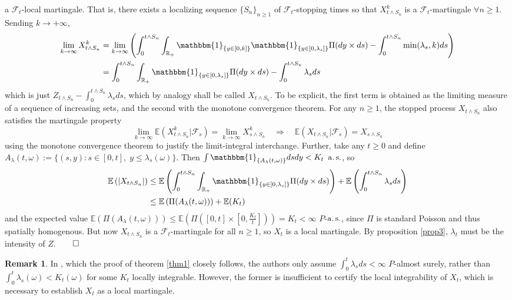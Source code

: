 \documentclass[12pt, oneside]{report}
\newcommand{\E}{\mathbb{E}}
\newcommand{\mbb}[1]{\mathbb{#1}}
\newcommand{\1}[1]{\mathbbm{1}_{\{#1\}}}
\newcommand{\mc}[1]{\mathcal{#1}}
\theoremstyle{definition}
\newtheorem{remark}[theorem]{Remark}
\begin{document}
a $\mc{F}_t$-local martingale. That is, there exists a localizing sequence
$\{S_n\}_{n\geq 1}$ of $\mc{F}_t$-stopping times so that $X^k_{t\wedge S_n}$ is
a $\mc{F}_t$-martingale $\forall n\geq 1$. Sending $k\rightarrow+\infty$,
\begin{align*}
    \lim_{k\rightarrow\infty}X^k_{t\wedge S_n}&=\lim_{k\rightarrow\infty}\left(\int^{t\wedge S_n}_0\int_{\mbb{R}_+}\1{y\in[0,k]}\1{y\in[0,\lambda_s]}\Pi(dy\times ds)-\int_0^{t\wedge S_n}\min(\lambda_s,k)ds\right)\\
    &=\int_0^{t\wedge S_n}\int_{\mbb{R}_+}\1{y\in[0,\lambda_s]}\Pi(dy\times ds)-\int_0^{t\wedge S_n}\lambda_sds
\end{align*}
which is just $Z_{t\wedge S_n}-\int_0^{t\wedge S_n}\lambda_sds$, which by
analogy shall be called $X_{t\wedge S_n}$. To be explicit, the first term is
obtained as the limiting measure of a sequence of increasing sets, and the
second with the monotone convergence theorem. For any $n\geq 1$, the stopped
process $X_{t\wedge S_n}$ also satisfies the martingale property
\[\lim_{k\rightarrow\infty}\E\left(X^k_{t\wedge
S_n}|\mc{F}_s\right)=\lim_{k\rightarrow\infty}X^k_{s\wedge
S_n}\quad\Rightarrow\quad\E\left(X_{t\wedge S_n}|\mc{F}_s\right)=X_{s\wedge
S_n}\] using the monotone convergence theorem to justify the limit-integral
interchange. Further, take any $t\geq 0$ and define
$A_\lambda(t,\omega):=\{(s,y):s\in[0,t],\;y\leq\lambda_s(\omega)\}$. Then
$\int\1{A_\lambda(t,\omega)}dsdy<K_t$ $\operatorname{a.s.}$, so
\begin{align*}
    \E\left(|X_{t\wedge S_n}|\right)&\leq \E\left(\int_0^{t\wedge S_n}\int_{\mbb{R}_+}\1{y\in[0,\lambda_s]}\Pi(dy\times ds)\right)+\E\left(\int_0^{t\wedge S_n}\lambda_sds\right)\\
    &\leq\E\left(\Pi(A_\lambda(t,\omega))\right)+\E(K_t)
\end{align*}
and the expected value
$\E(\Pi(A_\lambda(t,\omega)))\leq\E(\Pi([0,t]\times[0,\tfrac{K_t}{t}]))=K_t<\infty$
$P$-$\operatorname{a.s.}$, since $\Pi$ is standard Poisson and thus spatially homogenous. But
now $X_{t\wedge S_n}$ is a $\mc{F}_t$-martingale for all $n\geq 1$, so $X_t$ is
a local martingale. By proposition \ref{prop3}, $\lambda_t$ must be the
intensity of $Z$.\hfill{$\qed$}
\begin{remark}\label{rem2}
    In \cite[theorem B.11]{Chevallier_Caceres_Doumic_Reynaud_Bouret_2015}, which
    the proof of theorem \ref{thm1} closely follows, the authors only assume
    $\int_0^t\lambda_sds<\infty$ $P$-almost surely, rather than
    $\int_0^t\lambda_s(\omega)<K_t(\omega)$ for some $K_t$ locally integrable.
    However, the former is insufficient to certify the local integrability of
    $X_t$, which is necessary to establish $X_t$ as a local martingale.
\end{remark}
\end{document}
